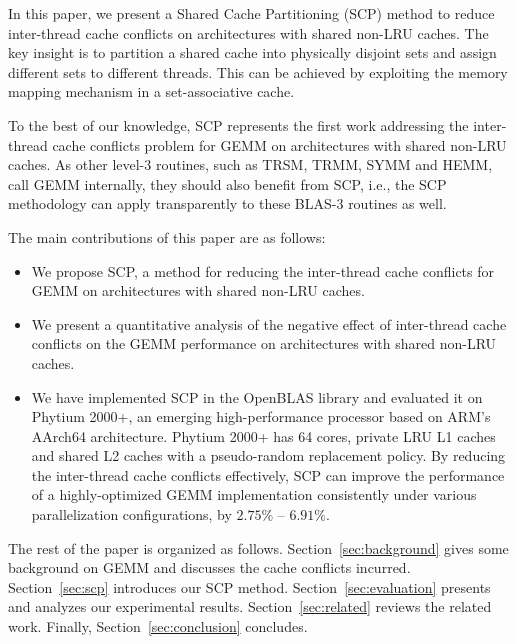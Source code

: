 In this paper, we present a Shared Cache Partitioning (SCP) method
to reduce inter-thread cache conflicts on architectures with shared non-LRU caches.
The key insight is to partition a
shared cache into physically disjoint sets
and assign different sets to different threads. This can be achieved by
exploiting the memory mapping mechanism in a 
set-associative cache.

To the best of our knowledge, SCP represents
the first work addressing
the inter-thread cache conflicts problem for GEMM on
architectures with shared non-LRU caches.
As other level-3 routines, such as TRSM, TRMM, SYMM and HEMM,
call GEMM internally, they should also benefit from SCP,
i.e., the SCP methodology can apply transparently to these
BLAS-3 routines as well.

The main contributions of this paper are as follows:
\begin{itemize}
\item We propose SCP, a method for reducing 
	the inter-thread cache conflicts
  for GEMM on architectures with shared non-LRU caches.
\item We present a quantitative analysis of the negative effect of inter-thread cache
  conflicts on the GEMM performance
  on architectures with shared non-LRU caches.
\item We have implemented SCP in the OpenBLAS library and evaluated it on Phytium 2000+,
  an emerging high-performance processor based on ARM's AArch64 architecture.
  Phytium 2000+ has 64 cores, private LRU L1 caches
  and shared L2 caches with a pseudo-random
  replacement policy. By reducing the inter-thread
  cache conflicts effectively,
  SCP can improve the 
  performance of a highly-optimized
  GEMM implementation  consistently
  under various parallelization configurations, by 
  $2.75\%$ -- $6.91\%$.
\end{itemize}



The rest of the paper is organized as follows.
Section~\ref{sec:background} gives some background on GEMM and discusses
the cache conflicts incurred.
Section~\ref{sec:scp} introduces our SCP method.
Section~\ref{sec:evaluation} presents and
analyzes our experimental results.
Section~\ref{sec:related} reviews the related work.
Finally, Section~\ref{sec:conclusion} concludes.
